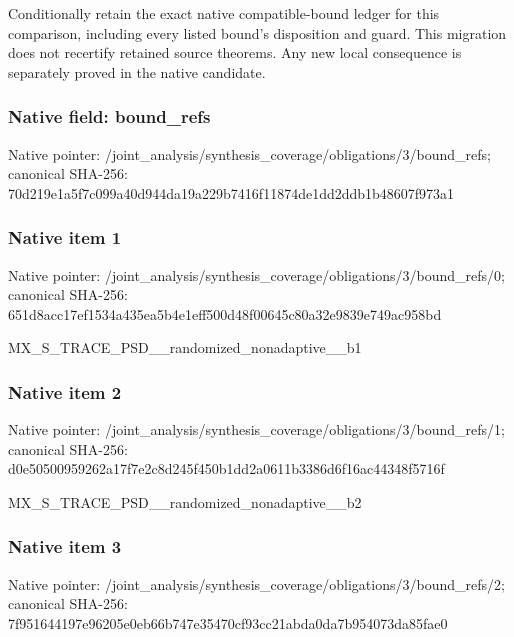 \documentclass[10pt,a4paper]{article}
\begin{document}
\begingroup\raggedright\sloppy Conditionally retain the exact native compatible-bound ledger for this comparison,\allowbreak{} including every listed bound's disposition and guard. This migration does not recertify retained source theorems. Any new local consequence is separately proved in the native candidate.\par\endgroup

\subsubsection{Native field: bound\_\allowbreak{}refs}
Native pointer: /joint\_\allowbreak{}analysis/synthesis\_\allowbreak{}coverage/obligations/3/bound\_\allowbreak{}refs; canonical SHA-256: 70d219e1a5f7c099a40d944da19a229b7416f11874de1dd2ddb1b48607f973a1

\subsubsection{Native item 1}
Native pointer: /joint\_\allowbreak{}analysis/synthesis\_\allowbreak{}coverage/obligations/3/bound\_\allowbreak{}refs/0; canonical SHA-256: 651d8acc17ef1534a435ea5b4e1eff500d48f00645c80a32e9839e749ac958bd

\begingroup\raggedright\sloppy MX\_\allowbreak{}S\_\allowbreak{}TRACE\_\allowbreak{}PSD\_\allowbreak{}\_\allowbreak{}randomized\_\allowbreak{}nonadaptive\_\allowbreak{}\_\allowbreak{}b1\par\endgroup

\subsubsection{Native item 2}
Native pointer: /joint\_\allowbreak{}analysis/synthesis\_\allowbreak{}coverage/obligations/3/bound\_\allowbreak{}refs/1; canonical SHA-256: d0e50500959262a17f7e2c8d245f450b1dd2a0611b3386d6f16ac44348f5716f

\begingroup\raggedright\sloppy MX\_\allowbreak{}S\_\allowbreak{}TRACE\_\allowbreak{}PSD\_\allowbreak{}\_\allowbreak{}randomized\_\allowbreak{}nonadaptive\_\allowbreak{}\_\allowbreak{}b2\par\endgroup

\subsubsection{Native item 3}
Native pointer: /joint\_\allowbreak{}analysis/synthesis\_\allowbreak{}coverage/obligations/3/bound\_\allowbreak{}refs/2; canonical SHA-256: 7f951644197e96205e0eb66b747e35470cf93cc21abda0da7b954073da85fae0
\end{document}
